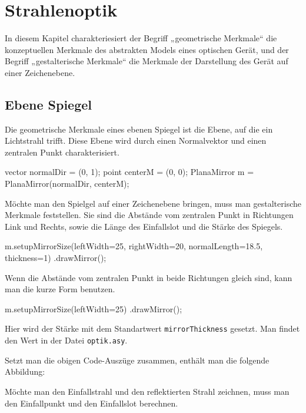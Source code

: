 \chapter{Strahlenoptik}

In diesem Kapitel charakteriesiert der Begriff „geometrische Merkmale“ die konzeptuellen Merkmale des abstrakten Models eines optischen Gerät,
und der Begriff „gestalterische Merkmale“ die Merkmale der Darstellung des Gerät auf einer Zeichenebene.

\section{Ebene Spiegel}

Die geometrische Merkmale eines ebenen Spiegel ist die Ebene, auf die ein Lichtstrahl trifft.
Diese Ebene wird durch einen Normalvektor und einen zentralen Punkt charakterisiert.

\begin{asycode}
vector normalDir = (0, 1);
point centerM = (0, 0);
PlanaMirror m = PlanaMirror(normalDir, centerM);
\end{asycode}

Möchte man den Spielgel auf einer Zeichenebene bringen, muss man gestalterische Merkmale feststellen.
Sie sind die Abstände vom zentralen Punkt in Richtungen Link und Rechts, sowie die Länge des Einfallslot und die Stärke des Spiegels.

\begin{asycode}
m.setupMirrorSize(leftWidth=25, rightWidth=20, normalLength=18.5, thickness=1)
 .drawMirror();
\end{asycode}

Wenn die Abstände vom zentralen Punkt in beide Richtungen gleich sind, kann man die kurze Form benutzen.

\begin{asycode}
m.setupMirrorSize(leftWidth=25)
 .drawMirror();
\end{asycode}

Hier wird der Stärke mit dem Standartwert \texttt{mirrorThickness} gesetzt.
Man findet den Wert in der Datei \texttt{optik.asy}.

Setzt man die obigen Code-Auszüge zusammen, enthält man die folgende Abbildung:


Möchte man den Einfallstrahl und den reflektierten Strahl zeichnen, muss man den Einfallpunkt und den Einfallslot berechnen.
